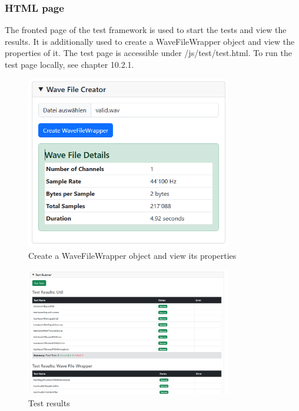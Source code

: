 \subsubsection{HTML page}
The fronted page of the test framework is used to start the tests and view the results.
It is additionally used to create a WaveFileWrapper object and view the properties of it.
The test page is accessible under /js/test/test.html.
To run the test page locally, see chapter 10.2.1.

\begin{figure}[H]
    \centering
    \includegraphics[width=0.8\textwidth]{../assets/wavefilecreator.png}
    \caption{Create a WaveFileWrapper object and view its properties}\label{fig:create-a-wavefilewrapper-object}
\end{figure}

\begin{figure}[H]
    \centering
    \includegraphics[width=0.8\textwidth]{../assets/test_results.png}
    \caption{Test results}\label{fig:test-results}
\end{figure}

